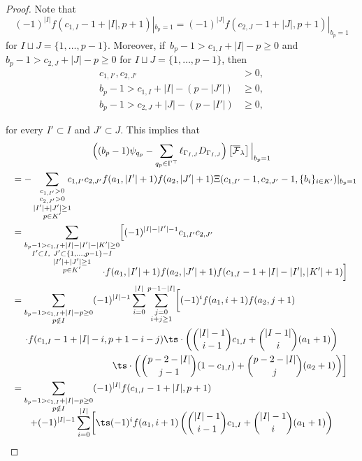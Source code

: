 \begin{proof}
Note that
\[
(-1)^{|I|}f(c_{1,I}-1+|I|,p+1)|_{b_p=1}=(-1)^{|J|}f(c_{2,J}-1+|J|,p+1)|_{b_p=1}
\]
for $I\sqcup J=\{1,\ldots,p-1\}$.
Moreover, if~$b_p-1>c_{1,I}+|I|-p\geq 0$ and $b_p-1>c_{2,J}+|J|-p\geq 0$ for $I\sqcup J=\{1,\ldots,p-1\}$, then
\begin{align*}
c_{1,I'}, c_{2,J'} & >  0,\\
b_p-1>c_{1,I}+|I|-(p-|J'|) & \geq  0,\\
b_p-1>c_{2,J}+|J|-(p-|I'|) & \geq  0,
\end{align*}
\noindent
\begin{minipage}{\textwidth}
for every $I'\subset I$ and $J'\subset J$. This implies that
\begin{multline*}
\Bigl( (b_p-1)\psi_{q_p}- \sum_{q_p\in \Gamma^{\top}}\ell_{\Gamma_{I,J}}D_{\Gamma_{I,J}}\Bigr)\left[\overline{\mathcal{F}}_{\lambda}\right]\Big|_{b_p=1}\\
\shoveleft{= -\sum_{\substack{c_{1,I'}>0 \\ c_{2,J'}>0 \\ |I'|+|J'|\geq 1 \\ p\in K'}}\hspace*{-2mm}
c_{1,I'}c_{2,J'}f(a_1,|I'|+1)f(a_2,|J'|+1)\Xi(c_{1,I'}-1,c_{2,J'}-1,\{b_i\}_{i\in K'})|_{b_p=1}}\\
\shoveleft{=\sum_{\substack{b_p-1>c_{1,I}+|I|-|I'|-|K'|\geq 0\\ I'\subset I , \ J' \subset \{1,\ldots,p-1\}-I \\ |I'|+|J'|\geq 1 \\ p\in K'}}\Bigl[(-1)^{|I|-|I'|-1}c_{1,I'}c_{2,J'}}\\[-15pt]
 \shoveright{\cdot f(a_1,|I'|+1)f(a_2,|J'|+1)f(c_{1,I}-1+|I|-|I'|,|K'|+1)\Bigr]}\\
\shoveleft{=\sum_{\substack{b_p-1>c_{1,I}+|I|-p\geq 0\\ p \notin I}}(-1)^{|I|-1}\sum_{i=0}^{|I|}\sum_{\substack{j=0\\i+j\geq 1}}^{p-1-|I|}\biggl[(-1)^i f(a_1,i+1)f(a_2,j+1)}\\
 \cdot f(c_{1,I}-1+|I|-i,p+1-i-j)
 \ts\cdot \left( \binom{|I|-1}{i-1}c_{1,I}+\binom{|I-1|}{i}(a_1+1)\right)\\
\shoveright{\ts\cdot\left( \binom{p-2-|I|}{j-1}(1-c_{1,I})+\binom{p-2-|I|}{j}(a_2+1) \right)\biggr]}\\
\shoveleft{=\sum_{\substack{b_p-1>c_{1,I}+|I|-p\geq 0\\ p\notin I}}(-1)^{|I|}f(c_{1,I}-1+|I|,p+1)}\\[-10pt]
+(-1)^{|I|-1} \sum_{i=0}^{|I|}\biggl[\ts(-1)^i f(a_1,i+1)\left( \binom{|I|-1}{i-1}c_{1,I}+\binom{|I|-1}{i}(a_1+1) \right)\\

\end{multline*}
\end{minipage}
\end{proof}
